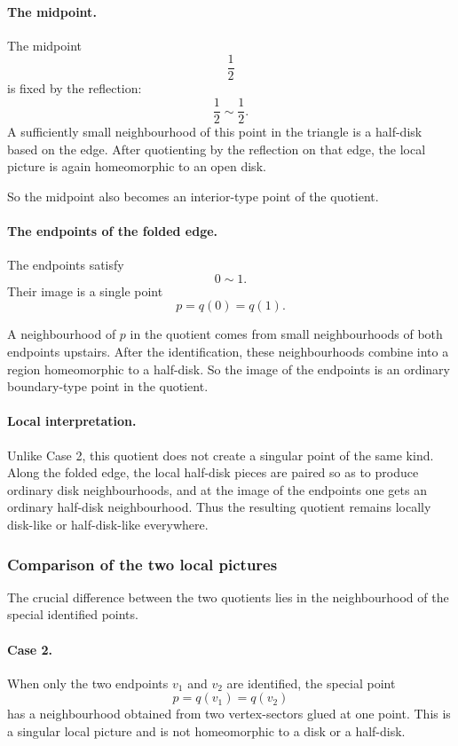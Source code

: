 \documentclass[12pt,a4paper]{article}
\theoremstyle{notespace}
\begin{document}
\paragraph{The midpoint.}
The midpoint
\[
\frac12
\]
is fixed by the reflection:
\[
\frac12 \sim \frac12.
\]
A sufficiently small neighbourhood of this point in the triangle is a half-disk based on the edge. After quotienting by the reflection on that edge, the local picture is again homeomorphic to an open disk.

So the midpoint also becomes an interior-type point of the quotient.

\paragraph{The endpoints of the folded edge.}
The endpoints satisfy
\[
0\sim 1.
\]
Their image is a single point
\[
p=q(0)=q(1).
\]

A neighbourhood of \(p\) in the quotient comes from small neighbourhoods of both endpoints upstairs. After the identification, these neighbourhoods combine into a region homeomorphic to a half-disk. So the image of the endpoints is an ordinary boundary-type point in the quotient.

\paragraph{Local interpretation.}
Unlike Case 2, this quotient does not create a singular point of the same kind. Along the folded edge, the local half-disk pieces are paired so as to produce ordinary disk neighbourhoods, and at the image of the endpoints one gets an ordinary half-disk neighbourhood. Thus the resulting quotient remains locally disk-like or half-disk-like everywhere.

\subsubsection{Comparison of the two local pictures}

The crucial difference between the two quotients lies in the neighbourhood of the special identified points.

\paragraph{Case 2.}
When only the two endpoints \(v_1\) and \(v_2\) are identified, the special point
\[
p=q(v_1)=q(v_2)
\]
has a neighbourhood obtained from two vertex-sectors glued at one point. This is a singular local picture and is not homeomorphic to a disk or a half-disk.
\end{document}
